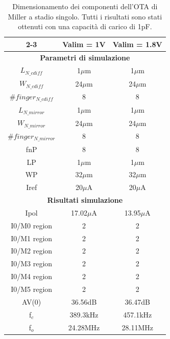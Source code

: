 \begin{table}[H]
    \centering
    \begin{tabular}{c|c|c|}
        \cline{2-3}
        & \textbf{Valim = 1V} & \textbf{Valim = 1.8V} \\ \hline
        \multicolumn{3}{|c|}{\textbf{Parametri di simulazione}} \\ \hline
        \multicolumn{1}{|c|}{$L_{N\_cdiff}$} & 1$\mu$m & 1$\mu$m \\ \hline
        \multicolumn{1}{|c|}{$W_{N\_cdiff}$} & 24$\mu$m & 24$\mu$m \\ \hline
        \multicolumn{1}{|c|}{$\#finger_{N\_cdiff}$} & 8 & 8 \\ \hline
        \multicolumn{1}{|c|}{$L_{N\_mirror}$} & 1$\mu$m & 1$\mu$m \\ \hline
        \multicolumn{1}{|c|}{$W_{N\_mirror}$} & 24$\mu$m & 24$\mu$m \\ \hline
        \multicolumn{1}{|c|}{$\#finger_{N\_mirror}$} & 8 & 8 \\ \hline
        \multicolumn{1}{|c|}{fnP} & 8 & 8 \\ \hline
        \multicolumn{1}{|c|}{LP} & 1$\mu$m & 1$\mu$m \\ \hline
        \multicolumn{1}{|c|}{WP} & 32$\mu$m & 32$\mu$m \\ \hline
        \multicolumn{1}{|c|}{Iref} & 20$\mu$A & 20$\mu$A \\ \hline
        \multicolumn{3}{|c|}{\textbf{Risultati simulazione}}  \\ \hline
        \multicolumn{1}{|c|}{Ipol} & 17.02$\mu$A & 13.95$\mu$A \\ \hline
        \multicolumn{1}{|c|}{I0/M0 region} & 2 & 2 \\ \hline
        \multicolumn{1}{|c|}{I0/M1 region} & 2 & 2 \\ \hline
        \multicolumn{1}{|c|}{I0/M2 region} & 2 & 2 \\ \hline
        \multicolumn{1}{|c|}{I0/M3 region} & 2 & 2 \\ \hline
        \multicolumn{1}{|c|}{I0/M4 region} & 2 & 2 \\ \hline
        \multicolumn{1}{|c|}{I0/M5 region} & 2 & 2 \\ \hline
        \multicolumn{1}{|c|}{AV(0)} & 36.56dB & 36.47dB \\ \hline
        \multicolumn{1}{|c|}{f$_c$} & 389.3kHz & 457.1kHz \\ \hline
        \multicolumn{1}{|c|}{f$_o$} & 24.28MHz & 28.11MHz \\ \hline
    \end{tabular}
    \caption{Dimensionamento dei componenti dell'OTA di Miller a stadio singolo. Tutti i risultati sono stati ottenuti con una capacità di carico di 1pF.}
    \label{tab:component_sizing_miller_single_stage}
\end{table}

